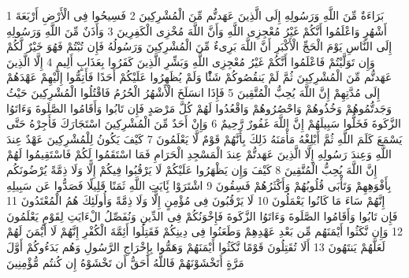 \documentclass[20pt,a4paper]{article}
\title{}
\author{}
\date{}
\begin{document}
\pagecolor{cl_page}



{\tiny\colorbox{cl_aya}{1}} بَرَاءَةٌ مِّنَ اللَّهِ وَرَسُولِهِ إِلَى الَّذِينَ عَهَدتُّم مِّنَ الْمُشْرِكِينَ
{\tiny\colorbox{cl_aya}{2}} فَسِيحُوا فِى الْأَرْضِ أَرْبَعَةَ أَشْهُرٍ وَاعْلَمُوا أَنَّكُمْ غَيْرُ مُعْجِزِى اللَّهِ وَأَنَّ اللَّهَ مُخْزِى الْكَفِرِينَ
{\tiny\colorbox{cl_aya}{3}} وَأَذَنٌ مِّنَ اللَّهِ وَرَسُولِهِ إِلَى النَّاسِ يَوْمَ الْحَجِّ الْأَكْبَرِ أَنَّ اللَّهَ بَرِىءٌ مِّنَ الْمُشْرِكِينَ وَرَسُولُهُ فَإِن تُبْتُمْ فَهُوَ خَيْرٌ لَّكُمْ وَإِن تَوَلَّيْتُمْ فَاعْلَمُوا أَنَّكُمْ غَيْرُ مُعْجِزِى اللَّهِ وَبَشِّرِ الَّذِينَ كَفَرُوا بِعَذَابٍ أَلِيمٍ
{\tiny\colorbox{cl_aya}{4}} إِلَّا الَّذِينَ عَهَدتُّم مِّنَ الْمُشْرِكِينَ ثُمَّ لَمْ يَنقُصُوكُمْ شَئًْا وَلَمْ يُظَهِرُوا عَلَيْكُمْ أَحَدًا فَأَتِمُّوا إِلَيْهِمْ عَهْدَهُمْ إِلَى مُدَّتِهِمْ إِنَّ اللَّهَ يُحِبُّ الْمُتَّقِينَ
{\tiny\colorbox{cl_aya}{5}} فَإِذَا انسَلَخَ الْأَشْهُرُ الْحُرُمُ فَاقْتُلُوا الْمُشْرِكِينَ حَيْثُ وَجَدتُّمُوهُمْ وَخُذُوهُمْ وَاحْصُرُوهُمْ وَاقْعُدُوا لَهُمْ كُلَّ مَرْصَدٍ فَإِن تَابُوا وَأَقَامُوا الصَّلَوةَ وَءَاتَوُا الزَّكَوةَ فَخَلُّوا سَبِيلَهُمْ إِنَّ اللَّهَ غَفُورٌ رَّحِيمٌ
{\tiny\colorbox{cl_aya}{6}} وَإِنْ أَحَدٌ مِّنَ الْمُشْرِكِينَ اسْتَجَارَكَ فَأَجِرْهُ حَتَّى يَسْمَعَ كَلَمَ اللَّهِ ثُمَّ أَبْلِغْهُ مَأْمَنَهُ ذَلِكَ بِأَنَّهُمْ قَوْمٌ لَّا يَعْلَمُونَ
{\tiny\colorbox{cl_aya}{7}} كَيْفَ يَكُونُ لِلْمُشْرِكِينَ عَهْدٌ عِندَ اللَّهِ وَعِندَ رَسُولِهِ إِلَّا الَّذِينَ عَهَدتُّمْ عِندَ الْمَسْجِدِ الْحَرَامِ فَمَا اسْتَقَمُوا لَكُمْ فَاسْتَقِيمُوا لَهُمْ إِنَّ اللَّهَ يُحِبُّ الْمُتَّقِينَ
{\tiny\colorbox{cl_aya}{8}} كَيْفَ وَإِن يَظْهَرُوا عَلَيْكُمْ لَا يَرْقُبُوا فِيكُمْ إِلًّا وَلَا ذِمَّةً يُرْضُونَكُم بِأَفْوَهِهِمْ وَتَأْبَى قُلُوبُهُمْ وَأَكْثَرُهُمْ فَسِقُونَ
{\tiny\colorbox{cl_aya}{9}} اشْتَرَوْا بَِٔايَتِ اللَّهِ ثَمَنًا قَلِيلًا فَصَدُّوا عَن سَبِيلِهِ إِنَّهُمْ سَاءَ مَا كَانُوا يَعْمَلُونَ
{\tiny\colorbox{cl_aya}{10}} لَا يَرْقُبُونَ فِى مُؤْمِنٍ إِلًّا وَلَا ذِمَّةً وَأُولَئِكَ هُمُ الْمُعْتَدُونَ
{\tiny\colorbox{cl_aya}{11}} فَإِن تَابُوا وَأَقَامُوا الصَّلَوةَ وَءَاتَوُا الزَّكَوةَ فَإِخْوَنُكُمْ فِى الدِّينِ وَنُفَصِّلُ الْءَايَتِ لِقَوْمٍ يَعْلَمُونَ
{\tiny\colorbox{cl_aya}{12}} وَإِن نَّكَثُوا أَيْمَنَهُم مِّن بَعْدِ عَهْدِهِمْ وَطَعَنُوا فِى دِينِكُمْ فَقَتِلُوا أَئِمَّةَ الْكُفْرِ إِنَّهُمْ لَا أَيْمَنَ لَهُمْ لَعَلَّهُمْ يَنتَهُونَ
{\tiny\colorbox{cl_aya}{13}} أَلَا تُقَتِلُونَ قَوْمًا نَّكَثُوا أَيْمَنَهُمْ وَهَمُّوا بِإِخْرَاجِ الرَّسُولِ وَهُم بَدَءُوكُمْ أَوَّلَ مَرَّةٍ أَتَخْشَوْنَهُمْ فَاللَّهُ أَحَقُّ أَن تَخْشَوْهُ إِن كُنتُم مُّؤْمِنِينَ
\end{document}
